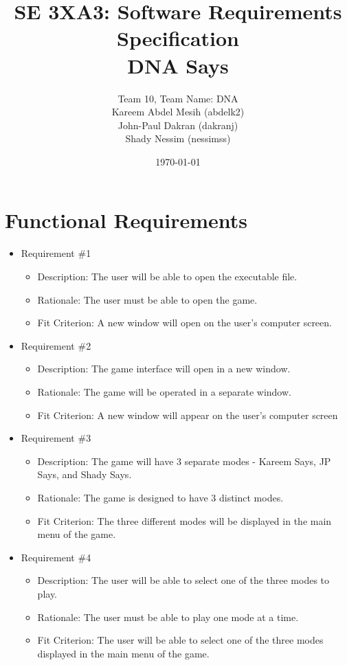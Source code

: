 \documentclass[12pt, titlepage]{article}
\title{SE 3XA3: Software Requirements Specification\\DNA Says}
\author{Team 10, Team Name: DNA
		\\ Kareem Abdel Mesih (abdelk2)
		\\ John-Paul Dakran (dakranj)
		\\ Shady Nessim (nessimss)
}
\date{\today}
\begin{document}
\maketitle


\newpage


\section{Functional Requirements}

\begin{itemize}

\item Requirement \#1
\begin{itemize}
\item Description: The user will be able to open the executable file.
\item Rationale: The user must be able to open the game.
\item Fit Criterion: A new window will open on the user's computer screen.
\end{itemize}

\item Requirement \#2
\begin{itemize}
\item Description: The game interface will open in a new window.
\item Rationale: The game will be operated in a separate window. 
\item Fit Criterion: A new window will appear on the user's computer screen
\end{itemize}

\item Requirement \#3
\begin{itemize}
\item Description: The game will have 3 separate modes - Kareem Says, JP Says, and Shady Says.
\item Rationale: The game is designed to have 3 distinct modes.
\item Fit Criterion: The three different modes will be displayed in the main menu of the game. 
\end{itemize}

\item Requirement \#4
\begin{itemize}
\item Description: The user will be able to select one of the three modes to play.
\item Rationale: The user must be able to play one mode at a time. 
\item Fit Criterion: The user will be able to select one of the three modes displayed in the main menu of the game.
\end{itemize}


\end{itemize}
\end{document}

